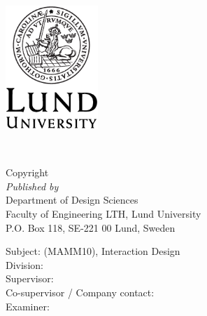 \documentclass[a4paper,11pt]{article}
\newcommand\HOne{\fontsize{20}{12}\selectfont}
\begin{document}
{  
}

\newpage

\begin{center}
  {\HOne \titleFull} \\
  \vspace{2.5cm}
  {\Large \name} \\
  \vspace{2.0cm}
  \includegraphics[width=3.5cm]{LU-logotyp-tryck-digitalt/EPS_for_tryck/Engelska/LundUniversity_C2line_BLACK.eps}

\end{center}



\newpage

{\Large \titleFull}
\vspace{1.5cm} \\
\begin{large}
  Copyright \textcopyright \ \the\year \ \name \\

  \textit{Published by} \vspace{0.2cm} \\
      Department of Design Sciences \\
      Faculty of Engineering LTH, Lund University \\
      P.O. Box 118, SE-221 00 Lund, Sweden

  \vspace{0.8cm}
  Subject: (MAMM10), Interaction Design \\
  Division: \division \\
  Supervisor: \supervisor \\
  Co-supervisor / Company contact: \contact \\
  Examiner: \examiner \\


\end{large}
\end{document}
